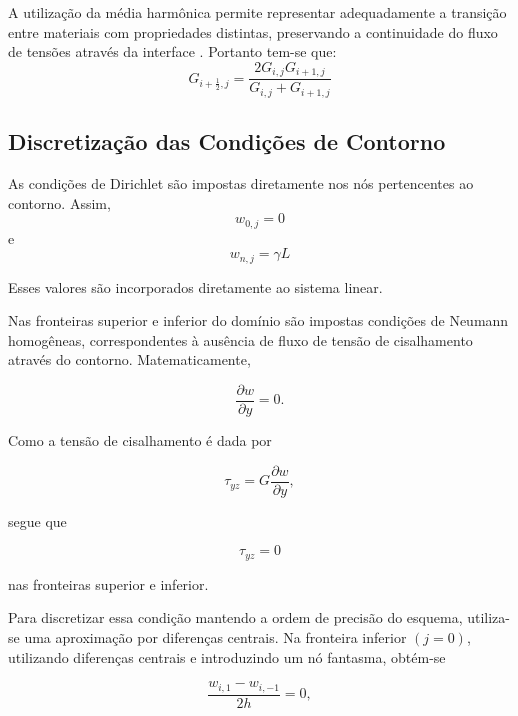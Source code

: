\documentclass[brazil]{TCAM} %
\begin{document}
A utilização da média harmônica permite representar adequadamente a
transição entre materiais com propriedades distintas, preservando a
continuidade do fluxo de tensões através da interface \cite{beale2006accuracy}.
Portanto tem-se que:
\begin{equation}
     G_{i+\frac12,j}= \dfrac{2G_{i,j}G_{i+1,j}}{G_{i,j}+G_{i+1,j}}
\end{equation}


\subsection{Discretização das Condições de Contorno}

As condições de Dirichlet são impostas diretamente nos nós pertencentes ao contorno. Assim,
\begin{equation*}
    w_{0,j}=0
\end{equation*}
e
\begin{equation*}
    w_{n,j}=\gamma L
\end{equation*}

Esses valores são incorporados diretamente ao sistema linear.

Nas fronteiras superior e inferior do domínio são impostas condições de Neumann homogêneas, correspondentes à ausência de fluxo de tensão de cisalhamento através do contorno. Matematicamente,

\begin{equation*}
\frac{\partial w}{\partial y}=0.
\end{equation*}

Como a tensão de cisalhamento é dada por

\begin{equation}
\tau_{yz}=G\frac{\partial w}{\partial y},
\end{equation}

segue que

\begin{equation*}
\tau_{yz}=0
\end{equation*}

nas fronteiras superior e inferior.

Para discretizar essa condição mantendo a ordem de precisão do esquema, utiliza-se uma aproximação por diferenças centrais.
Na fronteira inferior $(j=0)$, utilizando diferenças centrais e introduzindo um nó fantasma, obtém-se

\begin{equation*}
\frac{w_{i,1}-w_{i,-1}}{2h}=0,
\end{equation*}
\end{document}
